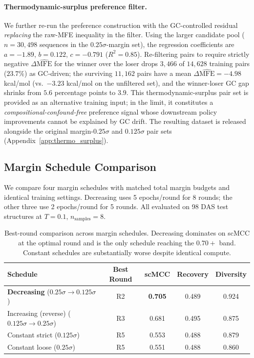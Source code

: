 {{\paragraph{Thermodynamic-surplus preference filter.}
We further re-run the preference construction with the GC-controlled residual \emph{replacing} the raw-MFE inequality in the filter. Using the larger candidate pool ($n=30{,}498$ sequences in the $0.25\sigma$-margin set), the regression coefficients are $a=-1.89$, $b=0.122$, $c=-0.791$ ($R^2 = 0.85$). Re-filtering pairs to require strictly negative $\Delta\widehat{\mathrm{MFE}}$ for the winner over the loser drops $3{,}466$ of $14{,}628$ training pairs ($23.7\%$) as GC-driven; the surviving $11{,}162$ pairs have a mean $\Delta\widehat{\mathrm{MFE}} = -4.98$ kcal/mol (vs.\ $-3.23$ kcal/mol on the unfiltered set), and the winner-loser GC gap shrinks from $5.6$ percentage points to $3.9$. This thermodynamic-surplus pair set is provided as an alternative training input; in the limit, it constitutes a \emph{compositional-confound-free} preference signal whose downstream policy improvements cannot be explained by GC drift. The resulting dataset is released alongside the original margin-$0.25\sigma$ and $0.125\sigma$ pair sets (Appendix~\ref{app:thermo_surplus}).


\subsection{Margin Schedule Comparison}
\label{app:schedule_comparison}

We compare four margin schedules with matched total margin budgets and identical training settings. Decreasing uses 5 epochs/round for 8 rounds; the other three use 2 epochs/round for 5 rounds. All evaluated on 98 DAS test structures at $T=0.1$, $n_{\text{samples}}=8$.

\begin{table}[h]
\centering
\caption{Best-round comparison across margin schedules. Decreasing dominates on scMCC at the optimal round and is the only schedule reaching the $0.70+$ band. Constant schedules are substantially worse despite identical compute.}
\label{tab:schedule_comparison}
\small
\begin{tabular}{lcccc}
\toprule
\textbf{Schedule} & \textbf{Best Round} & \textbf{scMCC} & \textbf{Recovery} & \textbf{Diversity} \\
\midrule
\textbf{Decreasing} ($0.25\sigma\!\to\!0.125\sigma$) & R2 & \textbf{0.705} & 0.489 & 0.924 \\
Increasing (reverse) ($0.125\sigma\!\to\!0.25\sigma$) & R3 & 0.681 & 0.495 & 0.875 \\
Constant strict ($0.125\sigma$) & R5 & 0.553 & 0.488 & 0.879 \\
Constant loose ($0.25\sigma$) & R5 & 0.551 & 0.488 & 0.860 \\
\bottomrule
\end{tabular}
\end{table}

}}
